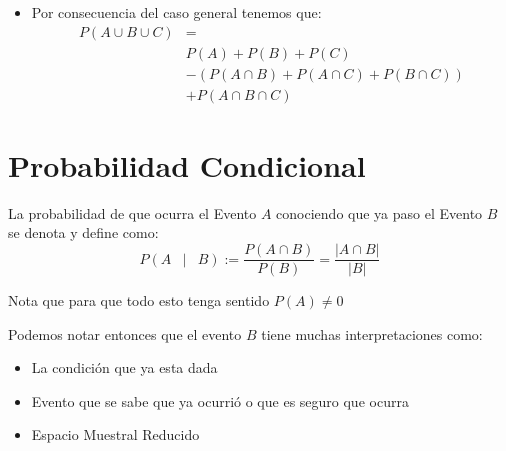 \documentclass[12pt, fleqn]{report}                             %
\DeclareMathOperator \Space {\quad}                             %
\DeclareMathOperator \MiniSpace {\;}                            %
\newcommand \Such {\MiniSpace | \MiniSpace}                     %
\theoremstyle{break}                                            %
\newcommand{\Wrap}[1]{\left( #1 \right)}                        %
\newcommand{\Mag}[1]{\left| #1 \right|}                         %
\begin{document}
\begin{itemize}
                \item Por consecuencia del caso general tenemos que: 
                    \begin{align*}
                        P(A \cup B \cup C) 
                            &=                                              \\
                            &P(A) + P(B) + P(C)                             \\
                            &-(P(A \cap B) + P(A \cap C) + P(B \cap C))     \\
                            &+ P(A \cap B \cap C)   
                    \end{align*}

            \end{itemize}

     

        \clearpage
        \section{Probabilidad Condicional}

            La probabilidad de que ocurra el Evento $A$ conociendo que ya paso
            el Evento $B$ se denota y define como:
            \begin{equation*}
                P \Wrap{ A \Such B}
                    := \frac{P(A \cap B)}{P(B)}
                    = \frac{\Mag{A \cap B}}{\Mag{B}}
            \end{equation*}

            Nota que para que todo esto tenga sentido $P(A) \neq 0$

            Podemos notar entonces que el evento $B$ tiene muchas interpretaciones
            como:
            \begin{itemize}
                \item La condición que ya esta dada
                \item Evento que se sabe que ya ocurrió o que es seguro que ocurra
                \item Espacio Muestral Reducido
            \end{itemize}


            \vspace{1em}
\end{document}
